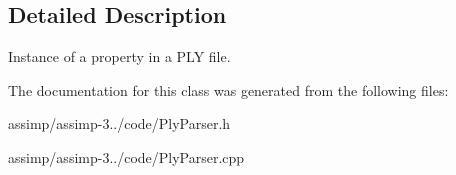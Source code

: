 \subsection{Detailed Description}
Instance of a property in a P\+L\+Y file. 

The documentation for this class was generated from the following files\+:\begin{DoxyCompactItemize}
\item 
assimp/assimp-\/3../code/Ply\+Parser.\+h\item 
assimp/assimp-\/3../code/Ply\+Parser.\+cpp\end{DoxyCompactItemize}
